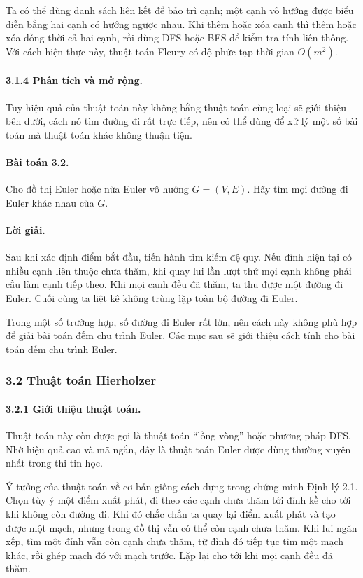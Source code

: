 \documentclass[11pt]{article}
\begin{document}
Ta có thể dùng danh sách liên kết để bảo trì cạnh; một cạnh vô hướng được biểu
diễn bằng hai cạnh có hướng ngược nhau. Khi thêm hoặc xóa cạnh thì thêm hoặc
xóa đồng thời cả hai cạnh, rồi dùng DFS hoặc BFS để kiểm tra tính liên thông.
Với cách hiện thực này, thuật toán Fleury có độ phức tạp thời gian \(O(m^2)\).

\paragraph{3.1.4 Phân tích và mở rộng.}
Tuy hiệu quả của thuật toán này không bằng thuật toán cùng loại sẽ giới thiệu
bên dưới, cách nó tìm đường đi rất trực tiếp, nên có thể dùng để xử lý một số
bài toán mà thuật toán khác không thuận tiện.

\paragraph{Bài toán 3.2.}
Cho đồ thị Euler hoặc nửa Euler vô hướng \(G=(V,E)\). Hãy tìm mọi đường đi
Euler khác nhau của \(G\).

\paragraph{Lời giải.}
Sau khi xác định điểm bắt đầu, tiến hành tìm kiếm đệ quy. Nếu đỉnh hiện tại có
nhiều cạnh liên thuộc chưa thăm, khi quay lui lần lượt thử mọi cạnh không phải
cầu làm cạnh tiếp theo. Khi mọi cạnh đều đã thăm, ta thu được một đường đi
Euler. Cuối cùng ta liệt kê không trùng lặp toàn bộ đường đi Euler.

Trong một số trường hợp, số đường đi Euler rất lớn, nên cách này không phù hợp
để giải bài toán đếm chu trình Euler. Các mục sau sẽ giới thiệu cách tính cho
bài toán đếm chu trình Euler.

\subsubsection*{3.2 Thuật toán Hierholzer}

\paragraph{3.2.1 Giới thiệu thuật toán.}
Thuật toán này còn được gọi là thuật toán ``lồng vòng'' hoặc phương pháp DFS.
Nhờ hiệu quả cao và mã ngắn, đây là thuật toán Euler được dùng thường xuyên
nhất trong thi tin học.

Ý tưởng của thuật toán về cơ bản giống cách dựng trong chứng minh Định lý 2.1.
Chọn tùy ý một điểm xuất phát, đi theo các cạnh chưa thăm tới đỉnh kề cho tới
khi không còn đường đi. Khi đó chắc chắn ta quay lại điểm xuất phát và tạo được
một mạch, nhưng trong đồ thị vẫn có thể còn cạnh chưa thăm. Khi lui ngăn xếp,
tìm một đỉnh vẫn còn cạnh chưa thăm, từ đỉnh đó tiếp tục tìm một mạch khác, rồi
ghép mạch đó với mạch trước. Lặp lại cho tới khi mọi cạnh đều đã thăm.
\end{document}
